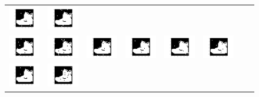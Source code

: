 \documentclass[12pt]{report}
\begin{document}
\begin{figure}[H]
\begin{tabular}{cccccccc}
  \includegraphics[width=0.15\linewidth]{11.png} &   \includegraphics[width=0.15\linewidth]{12.png} \\
  \includegraphics[width=0.15\linewidth]{13.png} &   \includegraphics[width=0.15\linewidth]{14.png} &
  \includegraphics[width=0.15\linewidth]{15.png} &   \includegraphics[width=0.15\linewidth]{16.png} &
  \includegraphics[width=0.15\linewidth]{17.png} &   \includegraphics[width=0.15\linewidth]{18.png} \\
  \includegraphics[width=0.15\linewidth]{19.png} &   \includegraphics[width=0.15\linewidth]{20.png} &

\end{tabular}
\end{figure}
\end{document}
